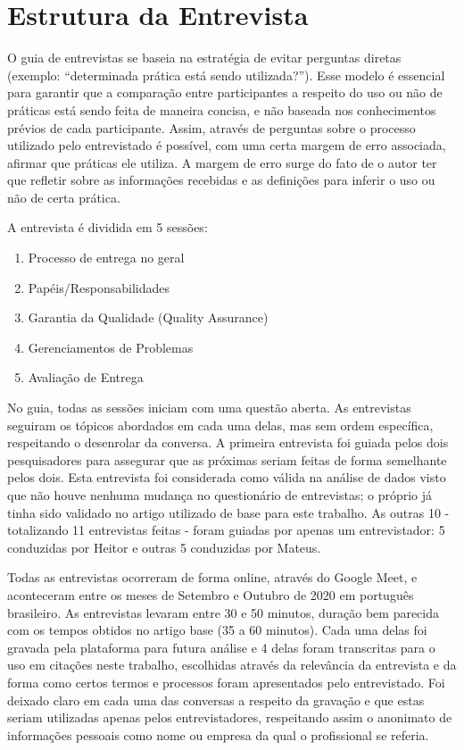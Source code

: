 
\section{Estrutura da Entrevista}

O guia de entrevistas se baseia na estratégia de evitar perguntas diretas (exemplo: “determinada prática está sendo utilizada?”). Esse modelo é essencial para garantir que a comparação entre participantes a respeito do uso ou não de práticas está sendo feita de maneira concisa, e não baseada nos conhecimentos prévios de cada participante. Assim, através de perguntas sobre o processo utilizado pelo entrevistado é possível, com uma certa margem de erro associada, afirmar que práticas ele utiliza. A margem de erro surge do fato de o autor ter que refletir sobre as informações recebidas e as definições para inferir o uso ou não de certa prática.

A entrevista é dividida em 5 sessões: 

\begin{enumerate}
\item Processo de entrega no geral
\item Papéis/Responsabilidades
\item Garantia da Qualidade (Quality Assurance)
\item Gerenciamentos de Problemas
\item Avaliação de Entrega
\end{enumerate}

No guia, todas as sessões iniciam com uma questão aberta. As entrevistas seguiram os tópicos abordados em cada uma delas, mas sem ordem específica, respeitando o desenrolar da conversa. A primeira entrevista foi guiada pelos dois pesquisadores para assegurar que as próximas seriam feitas de forma semelhante pelos dois. Esta entrevista foi considerada como válida na análise de dados visto que não houve nenhuma mudança no questionário de entrevistas; o próprio já tinha sido validado no artigo utilizado de base para este trabalho. As outras 10 - totalizando 11 entrevistas feitas - foram guiadas por apenas um entrevistador: 5 conduzidas por Heitor e outras 5 conduzidas por Mateus.


Todas as entrevistas ocorreram de forma online, através do Google Meet, e aconteceram entre os meses de Setembro e Outubro de 2020 em português brasileiro. As entrevistas levaram entre 30 e 50 minutos, duração bem parecida com os tempos obtidos no artigo base (35 a 60 minutos). Cada uma delas foi gravada pela plataforma para futura análise e 4 delas foram transcritas para o uso em citações neste trabalho, escolhidas através da relevância da entrevista e da forma como certos termos e processos foram apresentados pelo entrevistado. Foi deixado claro em cada uma das conversas a respeito da gravação e que estas seriam utilizadas apenas pelos entrevistadores, respeitando assim o anonimato de informações pessoais como nome ou empresa da qual o profissional se referia.

